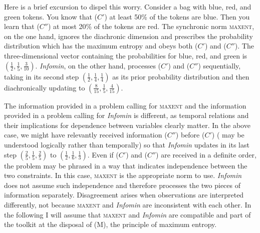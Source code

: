 \documentclass[11pt]{article}
\begin{document}
Here is a brief excursion to dispel this worry. Consider a bag with
blue, red, and green tokens. You know that ($C'$) at least 50\% of the
tokens are blue. Then you learn that ($C''$) at most 20\% of the tokens
are red. The synchronic norm \textsc{maxent}, on the one hand, ignores
the diachronic dimension and prescribes the probability distribution
which has the maximum entropy and obeys both ($C'$) and ($C''$). The
three-dimensional vector containing the probabilities for blue, red,
and green is $(\frac{1}{2},\frac{1}{5},\frac{3}{10})$. \emph{Infomin},
on the other hand, processes ($C'$) and ($C''$) sequentially, taking in its
second step $(\frac{1}{2},\frac{1}{4},\frac{1}{4})$ as its prior
probability distribution and then diachronically updating to
$(\frac{8}{15},\frac{1}{5},\frac{4}{15})$.

The information provided in a problem calling for \textsc{maxent} and
the information provided in a problem calling for \emph{Infomin} is
different, as temporal relations and their implications for dependence
between variables clearly matter. In the above case, we might have
relevantly received information ($C''$) before ($C'$) ( may
be understood logically rather than temporally) so that \emph{Infomin}
updates in its last step $(\frac{2}{5},\frac{1}{5},\frac{2}{5})$ to
$(\frac{1}{2},\frac{1}{6},\frac{1}{3})$. Even if ($C'$) and ($C''$) are
received in a definite order, the problem may be phrased in a way that
indicates independence between the two constraints. In this case,
\textsc{maxent} is the appropriate norm to use. \emph{Infomin} does
not assume such independence and therefore processes the two pieces of
information separately. Disagreement arises when observations are
interpreted differently, not because \textsc{maxent} and
\emph{Infomin} are inconsistent with each other. In the following I
will assume that \textsc{maxent} and \emph{Infomin} are compatible and
part of the toolkit at the disposal of (M), the principle of maximum
entropy.

\end{document}
